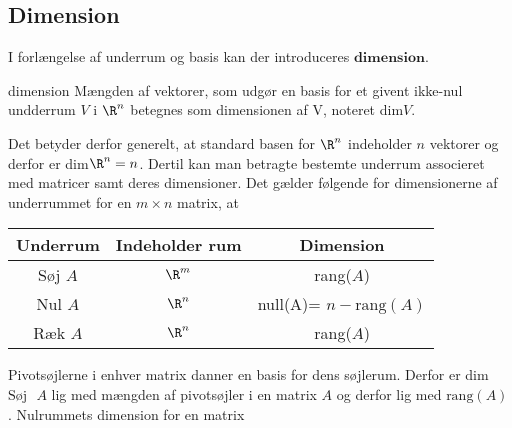 \subsection{Dimension}
I forlængelse af underrum og basis kan der introduceres 
$\mathbf{dimension}$. 
%
\begin{defn}{}{dimension}
Mængden af vektorer, som udgør en basis for et givent ikke-nul undderrum $V$ i $\R^n$ betegnes som dimensionen af V, noteret dim$V$. 
\end{defn}
\noindent
Det betyder derfor generelt, at standard basen for $\R^n$ indeholder $n$ vektorer og derfor er dim$\R^n = n$. Dertil kan man betragte bestemte underrum associeret med matricer samt deres dimensioner. Det gælder følgende for dimensionerne af underrummet for en $m \times n$ matrix, at \\ 
\begin{center}
 \begin{tabular}{||c c c||} 
 \hline
 Underrum & Indeholder rum & Dimension\\
 \hline\hline
 Søj $A$ & $\R^m$ & rang($A$)\\ 
 \hline
 Nul $A$ & $\R^n$ & null(A)= $n-\text{rang}(A)$\\
 \hline
 Ræk $A$ & $\R^n$ & rang($A$)\\
 \hline
\end{tabular}
\end{center}
\noindent
Pivotsøjlerne i enhver matrix danner en basis for dens søjlerum. Derfor er dim$\text{Søj}\text{  } A$ lig med mængden af pivotsøjler i en matrix $A$ og derfor lig med $\text{rang}(A)$. Nulrummets dimension for en matrix 